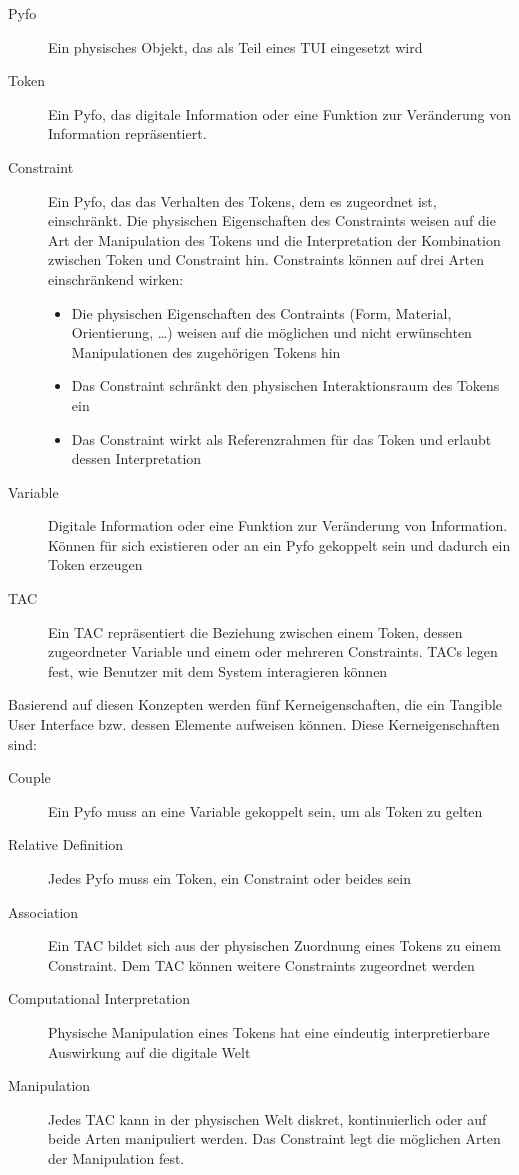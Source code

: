 \begin{description}
 \item[Pyfo] Ein physisches Objekt, das als Teil eines \gls{TUI} eingesetzt wird
 \item[Token] Ein Pyfo, das digitale Information oder eine Funktion zur Veränderung von Information repräsentiert.
 \item[Constraint] Ein Pyfo, das das Verhalten des Tokens, dem es zugeordnet ist, einschränkt. Die physischen Eigenschaften des Constraints weisen auf die Art der Manipulation des Tokens und die Interpretation der Kombination zwischen Token und Constraint hin. Constraints können auf drei Arten einschränkend wirken:
  \begin{itemize}
   \item Die physischen Eigenschaften des Contraints (Form, Material, Orientierung, \ldots) weisen auf die möglichen und nicht erwünschten Manipulationen des zugehörigen Tokens hin
   \item Das Constraint schränkt den physischen Interaktionsraum des Tokens ein
   \item Das Constraint wirkt als Referenzrahmen für das Token und erlaubt dessen Interpretation
  \end{itemize}
 \item[Variable] Digitale Information oder eine Funktion zur Veränderung von Information. Können für sich existieren oder an ein Pyfo gekoppelt sein und dadurch ein Token erzeugen
 \item[TAC] Ein \gls{TAC} repräsentiert die Beziehung zwischen einem Token, dessen zugeordneter Variable und einem oder mehreren Constraints. \glspl{TAC} legen fest, wie Benutzer mit dem System interagieren können
\end{description}

Basierend auf diesen Konzepten werden fünf Kerneigenschaften, die ein Tangible User Interface bzw. dessen Elemente aufweisen können. Diese Kerneigenschaften sind:

\begin{description}
	\item[Couple] Ein Pyfo muss an eine Variable gekoppelt sein, um als Token zu gelten
	\item[Relative Definition] Jedes Pyfo muss ein Token, ein Constraint oder beides sein
	\item[Association] Ein \gls{TAC} bildet sich aus der physischen Zuordnung eines Tokens zu einem Constraint. Dem \gls{TAC} können weitere Constraints zugeordnet werden
	\item[Computational Interpretation] Physische Manipulation eines Tokens hat eine eindeutig interpretierbare Auswirkung auf die digitale Welt
	\item[Manipulation] Jedes \gls{TAC} kann in der physischen Welt diskret, kontinuierlich oder auf beide Arten manipuliert werden. Das Constraint legt die möglichen Arten der Manipulation fest.  
\end{description}

